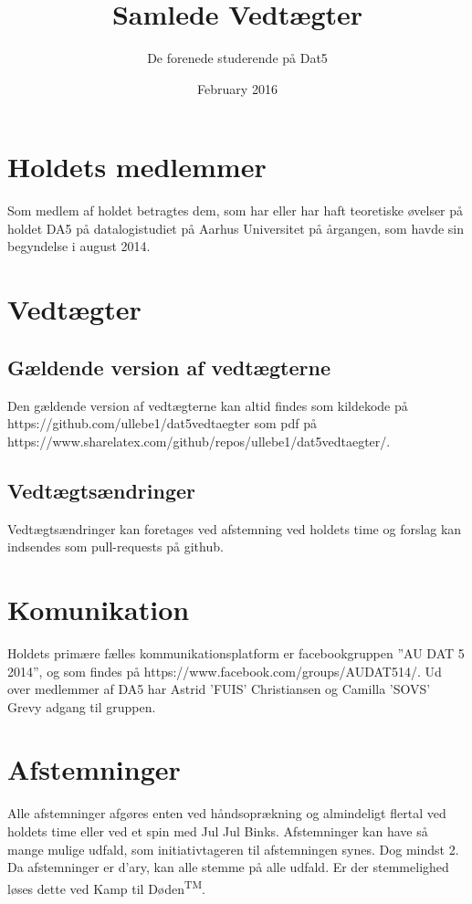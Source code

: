 \documentclass{article}
\title{Samlede Vedtægter}
\author{De forenede studerende på Dat5}
\date{February 2016}
\begin{document}
	
	\maketitle
	
	\section{Holdets medlemmer}
	Som medlem af holdet betragtes dem, som har eller har haft teoretiske øvelser på holdet DA5 på datalogistudiet på Aarhus Universitet på årgangen, som havde sin begyndelse i august 2014.
	
	\section{Vedtægter}
	\subsection{Gældende version af vedtægterne}
	Den gældende version af vedtægterne kan altid findes som kildekode på\\ https://github.com/ullebe1/dat5vedtaegter som pdf på\\ https://www.sharelatex.com/github/repos/ullebe1/dat5vedtaegter/.
	\subsection{Vedtægtsændringer}
	Vedtægtsændringer kan foretages ved afstemning ved holdets time og forslag kan indsendes som pull-requests på github.
	
	\section{Komunikation}
	Holdets primære fælles kommunikationsplatform er facebookgruppen ”AU DAT 5 2014”, og som findes på https://www.facebook.com/groups/AUDAT514/. Ud over medlemmer af DA5 har Astrid 'FUIS' Christiansen og Camilla 'SOVS' Grevy adgang til gruppen.
	
	\section{Afstemninger}
	Alle afstemninger afgøres enten ved håndsoprækning og almindeligt flertal ved holdets time eller ved et spin med Jul Jul Binks. Afstemninger kan have så mange mulige udfald, som initiativtageren til afstemningen synes. Dog mindst 2. Da afstemninger er d'ary, kan alle stemme på alle udfald. Er der stemmelighed løses dette ved Kamp til Døden\textsuperscript{TM}.
\end{document}
